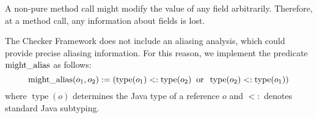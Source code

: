 
A non-pure method call might modify the value of any field arbitrarily.
Therefore, at a method call, any information about fields is lost.


\label{sec:alias}

The Checker Framework does not include an aliasing analysis, which could
provide precise aliasing information.  For this reason, we implement the
predicate $\operatorname{might\_alias}$ as follows:
\[ \operatorname{might\_alias}(o_1,o_2) :=
\left(\operatorname{type}(o_1) <: \operatorname{type}(o_2)
\;\;\text{or}\;\;
\operatorname{type}(o_2) <: \operatorname{type}(o_1) \right) \]
where $\operatorname{type}(o)$ determines the Java type of a reference $o$
and $<:$ denotes standard Java subtyping.



